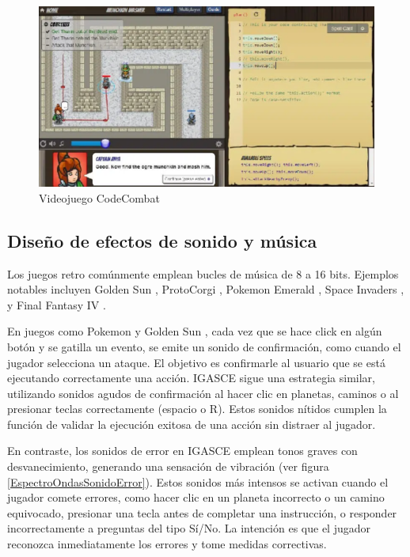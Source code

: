 \begin{figure}[h]
	\centering
	\includegraphics[scale=0.3]{imagenes/CodeCombat.png}
	\caption{Videojuego CodeCombat}
	\label{CodeCombat}
\end{figure}


\subsection{Diseño de efectos de sonido y música}

Los juegos retro comúnmente emplean bucles de música de 8 a 16 bits. Ejemplos notables incluyen Golden Sun \cite{Wiki_Golden_Sun}, ProtoCorgi \cite{ProtoCorgi}, Pokemon Emerald \cite{PokemonEmerald}, Space Invaders \cite{SpaceInvaders}, y Final Fantasy IV \cite{FinalFantasyIV}.

En juegos como Pokemon \cite{PokemonEmerald} y Golden Sun \cite{Wiki_Golden_Sun}, cada vez que se hace click en algún botón y se gatilla un evento, se emite un sonido de confirmación, como cuando el jugador selecciona un ataque. El objetivo es confirmarle al usuario que se está ejecutando correctamente una acción. IGASCE sigue una estrategia similar, utilizando sonidos agudos de confirmación al hacer clic en planetas, caminos o al presionar teclas correctamente (espacio o R). Estos sonidos nítidos cumplen la función de validar la ejecución exitosa de una acción sin distraer al jugador.

En contraste, los sonidos de error en IGASCE emplean tonos graves con desvanecimiento, generando una sensación de vibración (ver figura \ref{EspectroOndasSonidoError}). Estos sonidos más intensos se activan cuando el jugador comete errores, como hacer clic en un planeta incorrecto o un camino equivocado, presionar una tecla antes de completar una instrucción, o responder incorrectamente a preguntas del tipo Sí/No. La intención es que el jugador reconozca inmediatamente los errores y tome medidas correctivas.

